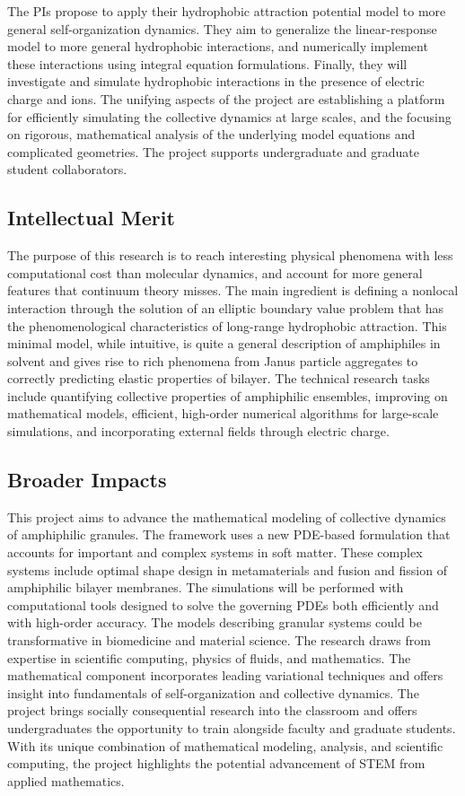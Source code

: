 \documentclass[10pt]{article}
\begin{document}
The PIs propose to apply their hydrophobic attraction potential model to
more general self-organization dynamics. They aim to generalize the
linear-response model to more general hydrophobic interactions, and
numerically implement these interactions using integral equation
formulations. Finally, they will investigate and simulate hydrophobic
interactions in the presence of electric charge and ions. The unifying
aspects of the project are establishing a platform for efficiently
simulating the collective dynamics at large scales, and the focusing on
rigorous, mathematical analysis of the underlying model equations and
complicated geometries. The project supports undergraduate and graduate
student collaborators.

\subsection*{Intellectual Merit}
\vspace{-0.1in}
The purpose of this research is to reach interesting physical phenomena
with less computational cost than molecular dynamics, and account for
more general features that continuum theory misses. The main ingredient
is defining a nonlocal interaction through the solution of an elliptic
boundary value problem that has the phenomenological characteristics of
long-range hydrophobic attraction. This minimal model, while intuitive,
is quite a general description of amphiphiles in solvent and gives rise
to rich phenomena from Janus particle aggregates to correctly predicting
elastic properties of bilayer. The technical research tasks include
quantifying collective properties of amphiphilic ensembles, improving on
mathematical models, efficient, high-order numerical algorithms for
large-scale simulations, and incorporating external fields through
electric charge.

\subsection*{Broader Impacts}
\vspace{-0.1in}
This project aims to advance the mathematical modeling of collective
dynamics of amphiphilic granules. The framework uses a new PDE-based
formulation that accounts for important and complex systems in soft
matter. These complex systems include optimal shape design in
metamaterials and fusion and fission of amphiphilic bilayer membranes.
The simulations will be performed with computational tools designed to
solve the governing PDEs both efficiently and with high-order accuracy.
The models describing granular systems could be transformative in
biomedicine and material science. The research draws from expertise in
scientific computing, physics of fluids, and mathematics. The
mathematical component incorporates leading variational techniques and
offers insight into fundamentals of self-organization and collective
dynamics. The project brings socially consequential research into the
classroom and offers undergraduates the opportunity to train alongside
faculty and graduate students. With its unique combination of
mathematical modeling, analysis, and scientific computing, the project
highlights the potential advancement of STEM from applied mathematics.
\end{document}
